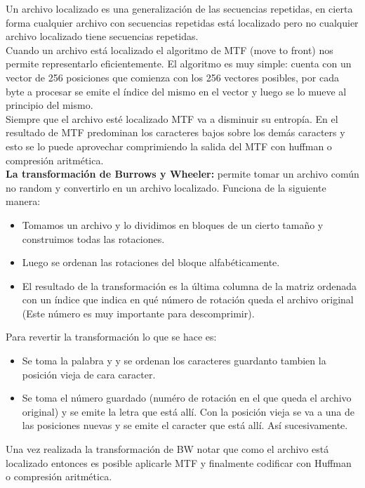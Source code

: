\documentclass[titlepage,a4paper]{article}
\begin{document}
Un archivo localizado es una generalización de las secuencias repetidas, en cierta forma cualquier archivo con secuencias repetidas está localizado pero no cualquier archivo localizado tiene secuencias repetidas. \\

Cuando un archivo está localizado el algoritmo de MTF (move to front) nos permite representarlo eficientemente. El algoritmo es muy simple: cuenta con un vector de 256 posiciones que comienza con los 256 vectores posibles, por cada byte a procesar se emite el índice del mismo en el vector y luego se lo mueve al principio del mismo. \\

Siempre que el archivo esté localizado MTF va a disminuir su entropía. En el resultado de MTF predominan los caracteres bajos sobre los demás caracters y esto se lo puede aprovechar comprimiendo la salida del MTF con huffman o compresión aritmética.\\ 

\textbf{La transformación de Burrows y Wheeler:} permite tomar un archivo común no random y convertirlo en un archivo localizado. Funciona de la siguiente manera: \\
\begin{itemize}
\item Tomamos un archivo y lo dividimos en bloques de un cierto tamaño y construimos todas las rotaciones. 
\item Luego se ordenan las rotaciones del bloque alfabéticamente. 
\item El resultado de la transformación es la última columna de la matriz ordenada con un índice que indica en qué número de rotación queda el archivo original (Este número es muy importante para descomprimir). 
\end{itemize}
Para revertir la transformación lo que se hace es: 
\begin{itemize}
\item Se toma la palabra y y se ordenan los caracteres guardanto tambien la posición vieja de cara caracter. 
\item Se toma el número guardado (numéro de rotación en el que queda el archivo original) y se emite la letra que está allí. Con la posición vieja se va a una de las posiciones nuevas y se emite el caracter que está allí. Así sucesivamente. 
\end{itemize}
Una vez realizada la transformación de BW notar que como el archivo está localizado entonces es posible aplicarle MTF y finalmente codificar con Huffman o compresión aritmética. 
\end{document}
